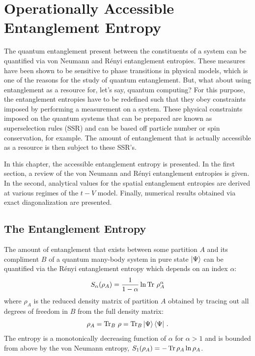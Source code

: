 \section{Operationally Accessible Entanglement Entropy}

The quantum entanglement present between the constituents of a system can be quantified via von Neumann and R\'enyi entanglement entropies. These measures have been shown to be sensitive to phase transitions in physical models, which is one of the reasons for the study of quantum entanglement. But, what about using entanglement as a resource for, let's say, quantum computing? For this purpose, the entanglement entropies have to be redefined such that they obey constraints imposed by performing a measurement on a system. These physical constraints imposed on the quantum systems that can be prepared are known as superselection rules (SSR) and can be based off particle number or spin conservation, for example. The amount of entanglement that is actually accessible as a resource is then subject to these SSR's.

In this chapter, the accessible entanglement entropy is presented. In the first section, a review of the von Neumann and R\'enyi entanglement entropies is given. In the second, analytical values for the spatial entanglement entropies are derived at various regimes of the $t-V$ model. Finally, numerical results obtained via exact diagonalization are presented.

\subsection{The \ren Entanglement Entropy}
\label{sec:accEntanglementIntro}

The amount of entanglement that exists between some partition $A$ and its compliment $B$ of a quantum many-body system in pure state $\ket{\Psi}$ can be quantified via the R\'{e}nyi entanglement entropy which depends on an index $\alpha$:
%
\begin{equation}
S_{\alpha} (\rho_A) = \frac{1}{1-\alpha}\ln \operatorname{Tr}\, \rho_A^{\alpha}
\label{eq:S_alpha}
\end{equation}
%
where $\rho_{A}$ is the reduced density matrix of partition $A$ obtained by
tracing out all degrees of freedom in $B$ from the full density matrix:
%
\begin{equation}
\rho_{A} = \operatorname{Tr}_{B}\, \rho = \operatorname{Tr}_{B} \ket{\Psi}\bra{\Psi}\,.
\end{equation}
%
The \ren entropy is a monotonically decreasing function of $\alpha$ for $\alpha
> 1$ and is bounded from above by the von Neumann entropy, $S_1(\rho_A) = -\operatorname{Tr} \rho_A \ln \rho_A$.

